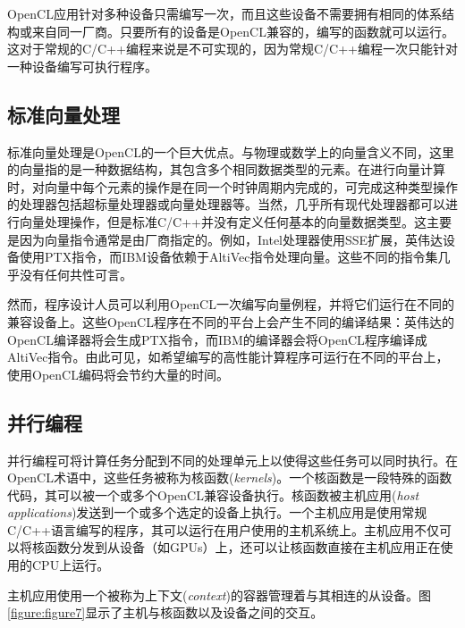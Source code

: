 OpenCL应用针对多种设备只需编写一次，而且这些设备不需要拥有相同的体系结构或来自同一厂商。只要所有的设备是OpenCL兼容的，编写的函数就可以运行。这对于常规的C/C++编程来说是不可实现的，因为常规C/C++编程一次只能针对一种设备编写可执行程序。

\subsection{标准向量处理}

标准向量处理是OpenCL的一个巨大优点。与物理或数学上的向量含义不同，这里的向量指的是一种数据结构，其包含多个相同数据类型的元素。在进行向量计算时，对向量中每个元素的操作是在同一个时钟周期内完成的，可完成这种类型操作的处理器包括超标量处理器或向量处理器等。当然，几乎所有现代处理器都可以进行向量处理操作，但是标准C/C++并没有定义任何基本的向量数据类型。这主要是因为向量指令通常是由厂商指定的。例如，Intel处理器使用SSE扩展，英伟达设备使用PTX指令，而IBM设备依赖于AltiVec指令处理向量。这些不同的指令集几乎没有任何共性可言。

然而，程序设计人员可以利用OpenCL一次编写向量例程，并将它们运行在不同的兼容设备上。这些OpenCL程序在不同的平台上会产生不同的编译结果：英伟达的OpenCL编译器将会生成PTX指令，而IBM的编译器会将OpenCL程序编译成AltiVec指令。由此可见，如希望编写的高性能计算程序可运行在不同的平台上，使用OpenCL编码将会节约大量的时间。

\subsection{并行编程}

并行编程可将计算任务分配到不同的处理单元上以使得这些任务可以同时执行。在OpenCL术语中，这些任务被称为核函数(\emph{kernels})。一个核函数是一段特殊的函数代码，其可以被一个或多个OpenCL兼容设备执行。核函数被主机应用(\emph{host applications})发送到一个或多个选定的设备上执行。一个主机应用是使用常规C/C++语言编写的程序，其可以运行在用户使用的主机系统上。主机应用不仅可以将核函数分发到从设备（如GPUs）上，还可以让核函数直接在主机应用正在使用的CPU上运行。

主机应用使用一个被称为上下文(\emph{context})的容器管理着与其相连的从设备。图\ref{figure:figure7}显示了主机与核函数以及设备之间的交互。

